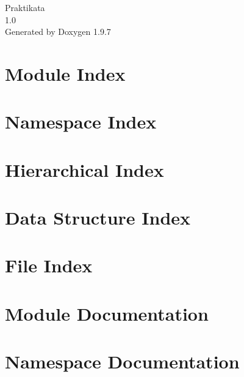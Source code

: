 \documentclass[twoside]{book}
\newcommand{\+}{\discretionary{\mbox{\scriptsize$\hookleftarrow$}}{}{}}
\newcommand{\clearemptydoublepage}{%
    \newpage{\pagestyle{empty}\cleardoublepage}%
  }
\begin{document}
  \raggedbottom
    \hypersetup{pageanchor=false,
                bookmarksnumbered=true,
                pdfencoding=unicode
               }
  \begin{titlepage}
  \vspace*{7cm}
  \begin{center}%
  {\Large Praktikata}\\
  [1ex]\large 1.\+0 \\
  \vspace*{1cm}
  {\large Generated by Doxygen 1.9.7}\\
  \end{center}
  \end{titlepage}
  \clearemptydoublepage
  \tableofcontents
  \clearemptydoublepage
  \hypersetup{pageanchor=true}



\chapter{Module Index}

\chapter{Namespace Index}

\chapter{Hierarchical Index}

\chapter{Data Structure Index}

\chapter{File Index}

\chapter{Module Documentation}





\chapter{Namespace Documentation}


















\end{document}
